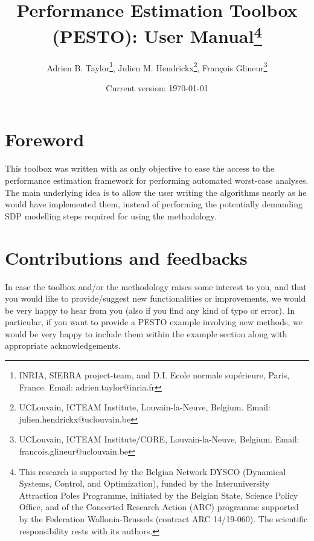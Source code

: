 \documentclass[11pt,a4paper]{article}
\begin{document}
	\author{Adrien B. Taylor\footnote{INRIA, SIERRA project-team, and D.I. Ecole normale sup\'erieure, Paris, France. Email: adrien.taylor@inria.fr}, Julien M. Hendrickx\footnote{UCLouvain, ICTEAM Institute, Louvain-la-Neuve, Belgium. Email:
			julien.hendrickx@uclouvain.be}, Fran\c{c}ois Glineur\footnote{UCLouvain, ICTEAM Institute/CORE, Louvain-la-Neuve, Belgium. Email: francois.glineur@uclouvain.be}}
	\title{Performance Estimation Toolbox (PESTO): User Manual\thanks{This research is supported by the Belgian Network DYSCO (Dynamical Systems, Control, and Optimization), funded by the Interuniversity Attraction Poles Programme, initiated by the Belgian State, Science Policy Office, and of the Concerted Research Action (ARC) programme supported by the Federation Wallonia-Brussels (contract ARC 14/19-060). The scientific responsibility rests with its authors.}}
	\date{Current version: \today}
	\maketitle

	\renewcommand*\contentsname{}
	\setcounter{tocdepth}{2} \tableofcontents

	\clearpage
	\section*{Foreword}
	This toolbox was written with as only objective to ease the access to the performance estimation framework for performing automated worst-case analyses. The main underlying idea is to allow the user writing the algorithms nearly as he would have implemented them, instead of performing the potentially demanding SDP modelling steps required for using the methodology.

	\section*{Contributions and feedbacks}
	In case the toolbox and/or the methodology raises some interest to you, and that you would like to provide/suggest new functionalities or improvements, we would be very happy to hear from you (also if you find any kind of typo or error). In particular, if you want to provide a PESTO example involving new methods, we would be very happy to include them within the example section along with appropriate acknowledgements.
	
\end{document}
